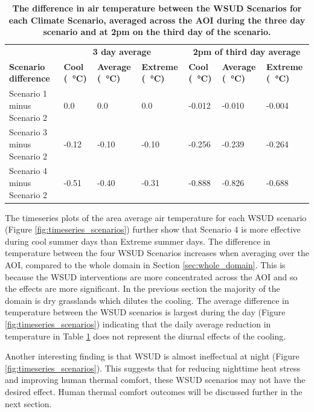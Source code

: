 \documentclass[final,3p,times,authoryear]{elsarticle}
\begin{document}
\begin{table}[!htbp]
\caption{\bf The difference in air temperature between the WSUD Scenarios for each Climate Scenario, averaged across the AOI during the three day scenario and at 2pm on the third day of the scenario. \label{tab:scenarioDiffRep}}     
\begin{tabular}{ l l l l l l l}
 \hline  \multicolumn{1}{|c}{}   &  \multicolumn{3}{|c|}{\textbf{3 day average}} & \multicolumn{3}{c|}{\textbf{2pm of third day average}}  \\
\textbf{Scenario difference} 
& \textbf{Cool (\SI{}{\degreeCelsius})}
& \textbf{Average (\SI{}{\degreeCelsius})}
& \textbf{Extreme (\SI{}{\degreeCelsius})}
& \textbf{Cool (\SI{}{\degreeCelsius})}
& \textbf{Average (\SI{}{\degreeCelsius})}
& \textbf{Extreme (\SI{}{\degreeCelsius})}
\\ \hline
Scenario 1 minus Scenario 2 & 0.0  & 0.0 & 0.0 &-0.012&-0.010&-0.004\\ 
Scenario 3 minus Scenario 2 & -0.12  & -0.10 & -0.10&-0.256&-0.239&-0.264\\ 
Scenario 4 minus Scenario 2 & -0.51  & -0.40 & -0.31&-0.888&-0.826&-0.688\\ 
\hline
\end{tabular}
\end{table}



The timeseries plots of the area average air temperature for each WSUD scenario (Figure \ref{fig:timeseries_scenarios}) further show that Scenario 4 is more effective during cool summer days than Extreme summer days. The difference in temperature between the four WSUD Scenarios increases when averaging over the AOI, compared to the whole domain in Section \ref{sec:whole_domain}. This is because the WSUD interventions are more concentrated across the AOI and so the effects are more significant. In the previous section the majority of the domain is dry grasslands which dilutes the cooling. The average difference in temperature between the WSUD scenarios is largest during the day (Figure \ref{fig:timeseries_scenarios}) indicating that the daily average reduction in temperature in Table \ref{tab:scenarioDiffRep} does not represent the diurnal effects of the cooling.

Another interesting finding is that WSUD is almost ineffectual at night (Figure \ref{fig:timeseries_scenarios}). This suggests that for reducing nighttime heat stress and improving human thermal comfort, these WSUD scenarios may not have the desired effect. Human thermal comfort outcomes will be discussed further in the next section.
\end{document}
